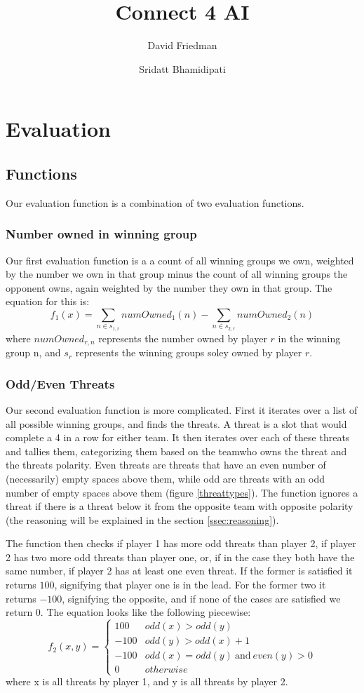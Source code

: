 \documentclass{article}
\title{Connect 4 AI}
\author{David Friedman \and Sridatt Bhamidipati}
\begin{document}
\maketitle
\newpage
\tableofcontents
\newpage
	
\section{Evaluation}
\subsection{Functions}
Our evaluation function is a combination of two evaluation functions.
\subsubsection{Number owned in winning group}
Our first evaluation function is a a count of all winning groups we own, weighted by the number we own in that group minus the count of all winning groups the opponent owns, again weighted by the number they own in that group. The equation for this is:
\[f_1(x)=\sum_{n \in s_{1,r}}{numOwned_1(n)}-\sum_{n \in s_{2,r}}{numOwned_2(n)}\]
where $numOwned_{r,n}$ represents the number owned by player $r$ in the winning group n, and $s_r$ represents the winning groups soley owned by player $r$.
\subsubsection{Odd/Even Threats}
Our second evaluation function is more complicated. First it iterates over a list of all possible winning groups, and finds the threats. A threat is a slot that would complete a 4 in a row for either team. It then iterates over each of these threats and tallies them, categorizing them based on the teamwho owns the threat and the threats polarity. Even threats are threats that have an even number of (necessarily) empty spaces above them, while odd are threats with an odd number of empty spaces above them (figure \ref{threattypes}). The function ignores a threat if there is a threat below it from the opposite team with opposite polarity (the reasoning will be explained in the section \ref{ssec:reasoning}). 
		
The function then checks if player 1 has more odd threats than player 2, if player 2 has two more odd threats than player one, or, if in the case they both have the same number, if player 2 has at least one even threat. If the former is satisfied it returns $100$, signifying that player one is in the lead. For the former two it returns $-100$, signifying the opposite, and if none of the cases are satisfied we return 0. The equation looks like the following piecewise:
\[ f_2(x,y)=\begin{cases} 
	100 & odd(x)>odd(y) \\
	-100 & odd(y)>odd(x)+1 \\
	-100 & odd(x)=odd(y)~\mbox{and}~even(y) > 0\\
	0 & otherwise
	\end{cases}
\]
where x is all threats by player 1, and y is all threats by player 2.
		
\end{document}
